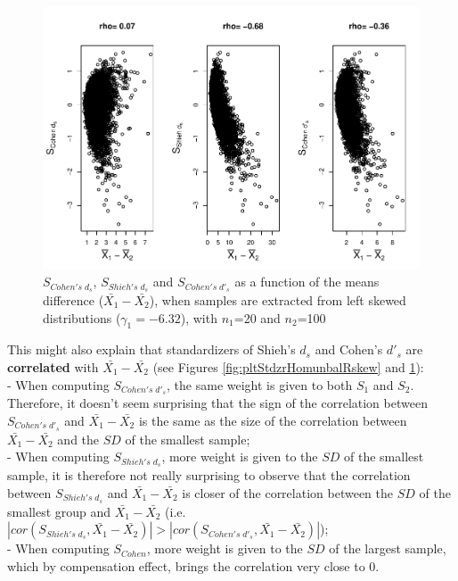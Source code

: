 \documentclass[
  man]{apa6}
\begin{document}
\begin{figure}
\centering
\includegraphics{Correlation_files/figure-latex/pltStdzrHomunbalLskew-1.pdf}
\caption{\label{fig:pltStdzrHomunbalLskew}\(S_{Cohen's \; d_s}\), \(S_{Shieh's \; d_s}\) and \(S_{Cohen's \; d'_s}\) as a function of the means difference (\(\bar{X_1}-\bar{X_2}\)), when samples are extracted from left skewed distributions (\(\gamma_1 = -6.32\)), with \(n_1\)=20 and \(n_2\)=100}
\end{figure}

This might also explain that standardizers of Shieh's \(d_s\) and Cohen's \(d'_s\) are \textbf{correlated} with \(\bar{X_1}-\bar{X_2}\) (see Figures \ref{fig:pltStdzrHomunbalRskew} and \ref{fig:pltStdzrHomunbalLskew}):\\
- When computing \(S_{Cohen's \; d'_s}\), the same weight is given to both \(S_1\) and \(S_2\). Therefore, it doesn't seem surprising that the sign of the correlation between \(S_{Cohen's \; d'_s}\) and \(\bar{X_1}-\bar{X_2}\) is the same as the size of the correlation between \(\bar{X_1}-\bar{X_2}\) and the \(SD\) of the smallest sample;\\
- When computing \(S_{Shieh's \; d_s}\), more weight is given to the \(SD\) of the smallest sample, it is therefore not really surprising to observe that the correlation between \(S_{Shieh's \; d_s}\) and \(\bar{X_1}-\bar{X_2}\) is closer of the correlation between the \(SD\) of the smallest group and \(\bar{X_1}-\bar{X_2}\) (i.e.~\(|cor(S_{Shieh's \; d_s},\bar{X_1}-\bar{X_2})| > |cor(S_{Cohen's \; d'_s},\bar{X_1}-\bar{X_2})|\));\\
- When computing \(S_{Cohen}\), more weight is given to the \(SD\) of the largest sample, which by compensation effect, brings the correlation very close to 0.
\end{document}

